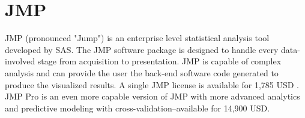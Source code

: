 \section{JMP}

JMP (pronounced "Jump") is an enterprise level statistical analysis tool
developed by SAS. The JMP software package is designed to handle every
data-involved stage from acquisition to presentation. JMP is capable of complex
analysis and can provide the user the back-end software code generated to
produce the visualized results. A single JMP license is available for 1,785 USD
\cite{JMPSAS}. JMP Pro is an even more capable version of JMP with more
advanced analytics and predictive modeling with cross-validation--available for
14,900 USD\cite{JMPPro}.
